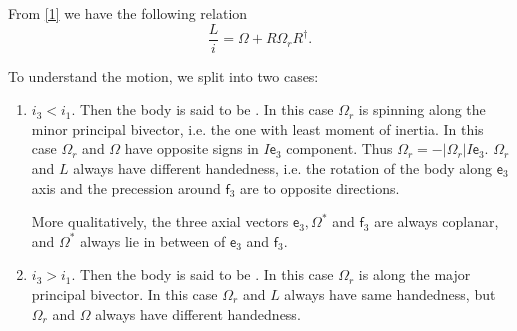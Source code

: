 From \eqref{1} we have the following relation
\begin{equation}
	\label{2}
	\frac{L}{i} = \Omega + R \Omega_r R^\dag
.\end{equation} 

To understand the motion, we split into two cases:
\begin{enumerate}
	\item $i_3 < i_1$. Then the body is said to be . In this case $\Omega_r$ is spinning along the minor principal bivector, i.e. the one with least moment of inertia. In this case $\Omega_r$ and $\Omega$ have opposite signs in $I \mathsf{e}_3$ component. Thus $\Omega_r = - |\Omega_r| I \mathsf{e}_3$. $\Omega_r$ and $L$ always have different handedness, i.e. the rotation of the body along $\mathsf{e}_3$ axis and the precession around $\mathsf{f}_3$ are to opposite directions. 

		More qualitatively, the three axial vectors $\mathsf{e}_3, \Omega^*$ and $\mathsf{f}_3$ are always coplanar, and $\Omega^*$ always lie in between of $\mathsf{e}_3$ and $\mathsf{f}_3$.
	

	\item $i_3 > i_1$. Then the body is said to be . In this case $\Omega_r$ is along the major principal bivector. In this case $\Omega_r$ and $L$ always have same handedness, but $\Omega_r$ and $\Omega$ always have different handedness.
\end{enumerate}








